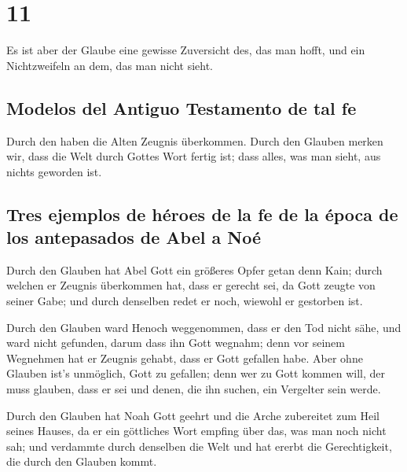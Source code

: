 \hypertarget{section-10}{%
\section{11}\label{section-10}}

 Es ist aber der Glaube eine gewisse Zuversicht des, das
man hofft, und ein Nichtzweifeln an dem, das man nicht sieht.

\hypertarget{modelos-del-antiguo-testamento-de-tal-fe}{%
\subsection{Modelos del Antiguo Testamento de tal
fe}\label{modelos-del-antiguo-testamento-de-tal-fe}}

 Durch den haben die Alten Zeugnis überkommen.
 Durch den Glauben merken wir, dass die Welt durch Gottes
Wort fertig ist; dass alles, was man sieht, aus nichts geworden ist.

\hypertarget{tres-ejemplos-de-huxe9roes-de-la-fe-de-la-uxe9poca-de-los-antepasados-de-abel-a-nouxe9}{%
\subsection{Tres ejemplos de héroes de la fe de la época de los
antepasados \hspace{0pt}\hspace{0pt}de Abel a
Noé}\label{tres-ejemplos-de-huxe9roes-de-la-fe-de-la-uxe9poca-de-los-antepasados-de-abel-a-nouxe9}}

 Durch den Glauben hat Abel Gott ein größeres Opfer getan
denn Kain; durch welchen er Zeugnis überkommen hat, dass er gerecht sei,
da Gott zeugte von seiner Gabe; und durch denselben redet er noch,
wiewohl er gestorben ist.

 Durch den Glauben ward Henoch weggenommen, dass er den
Tod nicht sähe, und ward nicht gefunden, darum dass ihn Gott wegnahm;
denn vor seinem Wegnehmen hat er Zeugnis gehabt, dass er Gott gefallen
habe.  Aber ohne Glauben ist's unmöglich, Gott zu
gefallen; denn wer zu Gott kommen will, der muss glauben, dass er sei
und denen, die ihn suchen, ein Vergelter sein werde.

 Durch den Glauben hat Noah Gott geehrt und die Arche
zubereitet zum Heil seines Hauses, da er ein göttliches Wort empfing
über das, was man noch nicht sah; und verdammte durch denselben die Welt
und hat ererbt die Gerechtigkeit, die durch den Glauben kommt.

